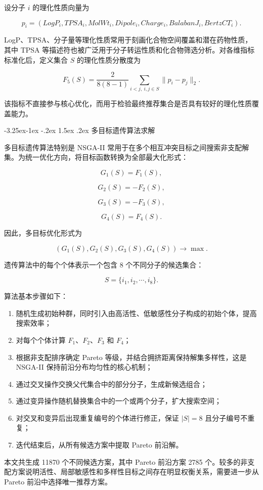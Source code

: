 \documentclass[withoutpreface,bwprint]{cumcmthesis}
\makeatletter
\renewcommand\subsection{\@startsection{subsection}{2}{\z@}%
  {-3.25ex\@plus -1ex \@minus -.2ex}%
  {1.5ex \@plus .2ex}%
  {\normalfont\zihao{-4}\heiti}}
\makeatother
\begin{document}
设分子 $i$ 的理化性质向量为

\[
p_i=(LogP_i,TPSA_i,MolWt_i,Dipole_i,Charge_i,BalabanJ_i,BertzCT_i).
\]

LogP、TPSA、分子量等理化性质常用于刻画化合物空间覆盖和潜在药物性质，其中 TPSA 等描述符也被广泛用于分子转运性质和化合物筛选分析\cite{ref:ohto2026multiobjective}。对各维指标标准化后，定义集合 $S$ 的理化性质分散度为

\[
F_5(S)=\frac{2}{8(8-1)}\sum_{i<j,\ i,j\in S}\|p_i-p_j\|_2.
\]

该指标不直接参与核心优化，而用于检验最终推荐集合是否具有较好的理化性质覆盖能力。

\subsection{多目标遗传算法求解}

多目标遗传算法特别是 NSGA-II 常用于在多个相互冲突目标之间搜索非支配解集\cite{ref:deb2002nsga2}。为统一优化方向，将目标函数转换为全部最大化形式：

\[
G_1(S)=F_1(S),
\]

\[
G_2(S)=-F_2(S),
\]

\[
G_3(S)=-F_3(S),
\]

\[
G_4(S)=F_4(S).
\]

因此，多目标优化形式为

\[
(G_1(S),G_2(S),G_3(S),G_4(S))\rightarrow \max.
\]

遗传算法中的每个个体表示一个包含 8 个不同分子的候选集合：

\[
S=\{i_1,i_2,\cdots,i_8\}.
\]

算法基本步骤如下：

\begin{enumerate}
\item 随机生成初始种群，同时引入由高活性、低敏感性分子构成的初始个体，提高搜索效率；
\item 对每个个体计算 $F_1$、$F_2$、$F_3$ 和 $F_4$；
\item 根据非支配排序确定 Pareto 等级，并结合拥挤距离保持解集多样性，这是 NSGA-II 保持前沿分布均匀性的核心机制\cite{ref:deb2002nsga2}；
\item 通过交叉操作交换父代集合中的部分分子，生成新候选组合；
\item 通过变异操作随机替换集合中的一个或两个分子，扩大搜索空间；
\item 对交叉和变异后出现重复编号的个体进行修正，保证 $|S|=8$ 且分子编号不重复；
\item 迭代结束后，从所有候选方案中提取 Pareto 前沿解。

\end{enumerate}
本文共生成 11870 个不同候选方案，其中 Pareto 前沿方案 2785 个。较多的非支配方案说明活性、局部敏感性和多样性目标之间存在明显权衡关系，需要进一步从 Pareto 前沿中选择唯一推荐方案。
\end{document}
